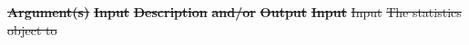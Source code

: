 \documentclass[12pt]{report} %
\providecommand{\DIFdeltex}[1]{{\protect\color{red}\sout{#1}}}                      %
\providecommand{\DIFdelend}{} %
\providecommand{\DIFdel}[1]{\texorpdfstring{\DIFdeltex{#1}}{}} %
\DeclareRobustCommand{\DIFdelend}{\DIFOaddend \let\includegraphics\DIFOincludegraphics} %
\begin{document}
\textbf{\DIFdel{Argument(s)}} %
\textbf{\DIFdel{Input }}  %
\textbf{\DIFdel{Description}} %
\textbf{\DIFdel{and/or}}     %
\textbf{\DIFdel{Output}} %
\textbf{\DIFdel{Input}} %
\DIFdel{Input        }%
\DIFdel{The statistics object to }\DIFdelend %
\end{document}

